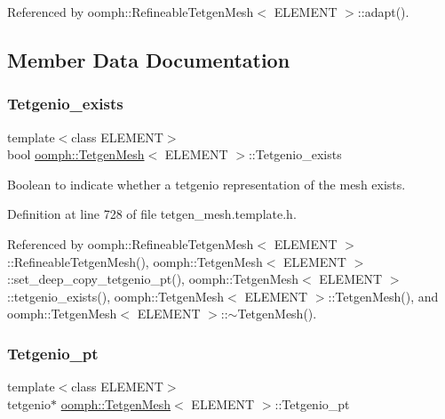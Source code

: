Referenced by oomph\+::\+Refineable\+Tetgen\+Mesh$<$ E\+L\+E\+M\+E\+N\+T $>$\+::adapt().



\subsection{Member Data Documentation}
\mbox{\label{classoomph_1_1TetgenMesh_ab9aa31216620790d084d133b8781be37}} 
\subsubsection{\texorpdfstring{Tetgenio\+\_\+exists}{Tetgenio\_exists}}
{\footnotesize\ttfamily template$<$class E\+L\+E\+M\+E\+NT$>$ \\
bool \hyperlink{classoomph_1_1TetgenMesh}{oomph\+::\+Tetgen\+Mesh}$<$ E\+L\+E\+M\+E\+NT $>$\+::Tetgenio\+\_\+exists\hspace{0.3cm}{\ttfamily [protected]}}



Boolean to indicate whether a tetgenio representation of the mesh exists. 



Definition at line 728 of file tetgen\+\_\+mesh.\+template.\+h.



Referenced by oomph\+::\+Refineable\+Tetgen\+Mesh$<$ E\+L\+E\+M\+E\+N\+T $>$\+::\+Refineable\+Tetgen\+Mesh(), oomph\+::\+Tetgen\+Mesh$<$ E\+L\+E\+M\+E\+N\+T $>$\+::set\+\_\+deep\+\_\+copy\+\_\+tetgenio\+\_\+pt(), oomph\+::\+Tetgen\+Mesh$<$ E\+L\+E\+M\+E\+N\+T $>$\+::tetgenio\+\_\+exists(), oomph\+::\+Tetgen\+Mesh$<$ E\+L\+E\+M\+E\+N\+T $>$\+::\+Tetgen\+Mesh(), and oomph\+::\+Tetgen\+Mesh$<$ E\+L\+E\+M\+E\+N\+T $>$\+::$\sim$\+Tetgen\+Mesh().

\mbox{\label{classoomph_1_1TetgenMesh_a508672e33aa773da58c834a526cb5c59}} 
\subsubsection{\texorpdfstring{Tetgenio\+\_\+pt}{Tetgenio\_pt}}
{\footnotesize\ttfamily template$<$class E\+L\+E\+M\+E\+NT$>$ \\
tetgenio$\ast$ \hyperlink{classoomph_1_1TetgenMesh}{oomph\+::\+Tetgen\+Mesh}$<$ E\+L\+E\+M\+E\+NT $>$\+::Tetgenio\+\_\+pt\hspace{0.3cm}{\ttfamily [protected]}}



